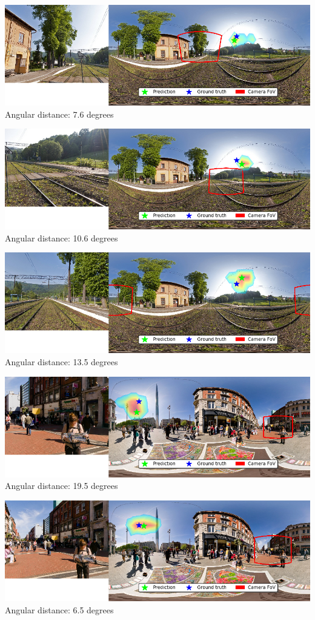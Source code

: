 \begin{multicols}{2}
\includegraphics[width=\mywidth]{pano_aasclkvkavzoym_003.jpg}\\
Angular distance: 7.6 degrees

\includegraphics[width=\mywidth]{pano_aasclkvkavzoym_005.jpg}\\
Angular distance: 10.6 degrees

\includegraphics[width=\mywidth]{pano_aasclkvkavzoym_006.jpg}\\
Angular distance: 13.5 degrees

\includegraphics[width=\mywidth]{pano_aasokgzjhapcau_002.jpg}\\
Angular distance: 19.5 degrees

\includegraphics[width=\mywidth]{pano_aasokgzjhapcau_003.jpg}\\
Angular distance: 6.5 degrees


\end{multicols}
